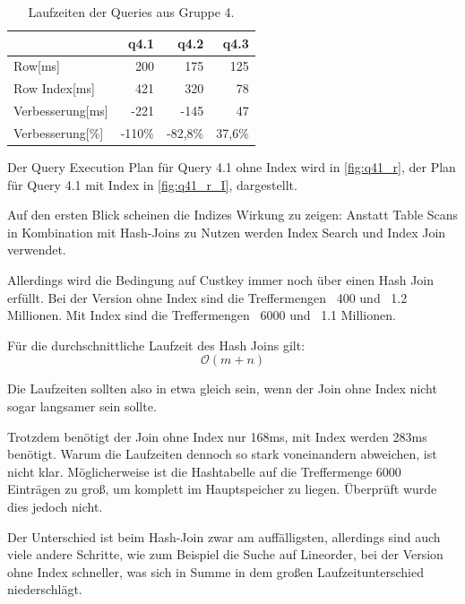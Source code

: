\setlength\intextsep{0pt}
\begin{table}[H]
    \begin{tabularx}{\linewidth}{lrrr}
        \toprule
                        & q4.1      &	q4.2        &	q4.3       \\
        \toprule
        Row[ms]	        & 200	    &	175	        &	125        \\
        Row Index[ms]   & 421	    &   320	        &   78          \\
        Verbesserung[ms]  & -221      &   -145        &   47         \\
        Verbesserung[\%]  & -110\%    &   -82,8\%     &   37,6\%       \\    
\bottomrule
\end{tabularx}
\caption{Laufzeiten der Queries aus Gruppe 4.}
\label{tab:q4_row}
\end{table}

Der Query Execution Plan für Query 4.1 ohne Index wird in \autoref{fig:q41_r}, der Plan für Query 4.1 mit Index in \autoref{fig:q41_r_I}, dargestellt.

Auf den ersten Blick scheinen die Indizes Wirkung zu zeigen: Anstatt Table Scans in Kombination mit Hash-Joins zu Nutzen werden Index Search und Index Join verwendet.

Allerdings wird die Bedingung auf Custkey immer noch über einen Hash Join erfüllt. Bei der Version ohne Index sind die Treffermengen ~400 und ~1.2 Millionen.
Mit Index sind die Treffermengen ~6000 und ~1.1 Millionen.

Für die durchschnittliche Laufzeit des  Hash Joins gilt:\cite{hash}
\begin{equation}
    \mathcal{O}(m+n)
\end{equation}

Die Laufzeiten sollten also in etwa gleich sein, wenn der Join ohne Index nicht sogar langsamer sein sollte.

Trotzdem benötigt der Join ohne Index nur 168ms, mit Index werden 283ms benötigt.
Warum die Laufzeiten dennoch so stark voneinandern abweichen, ist nicht klar. Möglicherweise ist 
die Hashtabelle auf die Treffermenge 6000 Einträgen zu groß, um komplett im Hauptspeicher zu liegen.
Überprüft wurde dies jedoch nicht.

Der Unterschied ist beim Hash-Join zwar am auffälligsten, allerdings sind auch viele andere Schritte, wie zum Beispiel die Suche auf Lineorder, bei der Version ohne Index schneller, was sich in Summe in dem großen Laufzeitunterschied niederschlägt.


